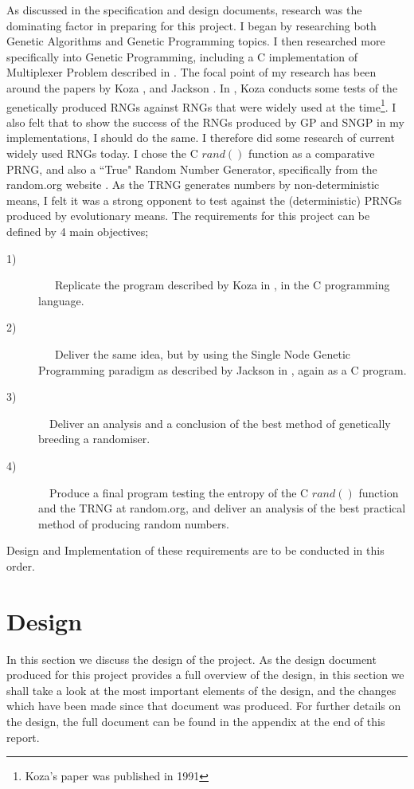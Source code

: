 \documentclass[a4paper,10.5pt]{article}
\begin{document}
As discussed in the specification and design documents, research was the dominating factor in preparing for this project. I began by researching both Genetic Algorithms \cite[p.1 - 24]{mitchell} and Genetic Programming \cite[p.1 - 35]{introgp} \cite[p.73 - 191]{kozagpbook} topics. I then researched more specifically into Genetic Programming, including a C implementation of Multiplexer Problem described in \cite{kozamux}. The focal point of my research has been around the papers by Koza \cite{kozarng}, and Jackson \cite{jacksonsngp}. In \cite{kozarng}, Koza conducts some tests of the genetically produced RNGs against RNGs that were widely used at the time\footnote{Koza's paper was published in 1991}. I also felt that to show the success of the RNGs produced by GP and SNGP in my implementations, I should do the same. I therefore did some research of current widely used RNGs today. I chose the C $rand()$ function as a comparative PRNG, and also a ``True" Random Number Generator, specifically from the random.org website \cite{randomorg}. As the TRNG generates numbers by non-deterministic means, I felt it was a strong opponent to test against the (deterministic) PRNGs produced by evolutionary means.
The requirements for this project can be defined by 4 main objectives;
\begin{description}
  \item[1)]
  \ \ \ Replicate the program described by Koza in \cite{kozarng}, in the C programming language. 
  \item[2)]
 \ \ \ Deliver the same idea, but by using the Single Node Genetic Programming paradigm as described by Jackson in \cite{jacksonsngp}, again as a C program.
  \item[3)]
  \ \  Deliver an analysis and a conclusion of the best method of genetically breeding a randomiser.
   \item[4)]
  \ \  Produce a final program testing the entropy of the C $rand()$ function and the TRNG at random.org, and deliver an analysis of the best practical method of producing random numbers.
\end{description}
Design and Implementation of these requirements are to be conducted in this order. 
\newpage
\section{Design}

\label{design}
In this section we discuss the design of the project. As the design document produced for this project provides a full overview of the design, in this section we shall take a look at the most important elements of the design, and the changes which have been made since that document was produced. For further details on the design, the full document can be found in the appendix at the end of this report. 
\end{document}
